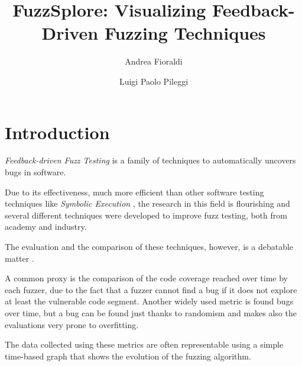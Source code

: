 \documentclass[conference,compsoc]{IEEEtran}
\begin{document}
\title{FuzzSplore: Visualizing Feedback-Driven Fuzzing Techniques}

\iffalse
\author{\IEEEauthorblockN{Andrea Fioraldi}
\IEEEauthorblockA{\textit{1692419}}
\and
\IEEEauthorblockN{Luigi Paolo Pileggi}
\IEEEauthorblockA{\textit{0000000}}
}

\author{\IEEEauthorblockN{Andrea Fioraldi\IEEEauthorrefmark{1}\IEEEauthorrefmark{2},
Luigi Paolo Pileggi\IEEEauthorrefmark{1}}
\IEEEauthorblockA{andreafioraldi@gmail.com,
gigimail@gigi.com\\
\IEEEauthorrefmark{1} Sapienza University of Rome,
\IEEEauthorrefmark{2} EURECOM}}
\fi

\author[1,2]{Andrea Fioraldi}
\author[1]{Luigi Paolo Pileggi}

\maketitle

\section{Introduction}

{\it Feedback-driven Fuzz Testing} is a family of techniques to automatically uncovers bugs in software.

Due to its effectiveness, much more efficient than other software testing techniques like {\it Symbolic Execution} \cite{redqueen} \cite{sebastian}, the research in this field is flourishing and several different techniques were developed to improve fuzz testing, both from academy and industry.

The evaluation and the comparison of these techniques, however, is a debatable matter \cite{fuzzeval}.

A common proxy is the comparison of the code coverage reached over time by each fuzzer, due to the fact that a fuzzer cannot find a bug if it does not explore at least the vulnerable code segment.
Another widely used metric is found bugs over time, but a bug can be found just thanks to randomism and makes also the evaluations very prone to overfitting.

The data collected using these metrics are often representable using a simple time-based graph that shows the evolution of the fuzzing algorithm.
\end{document}
